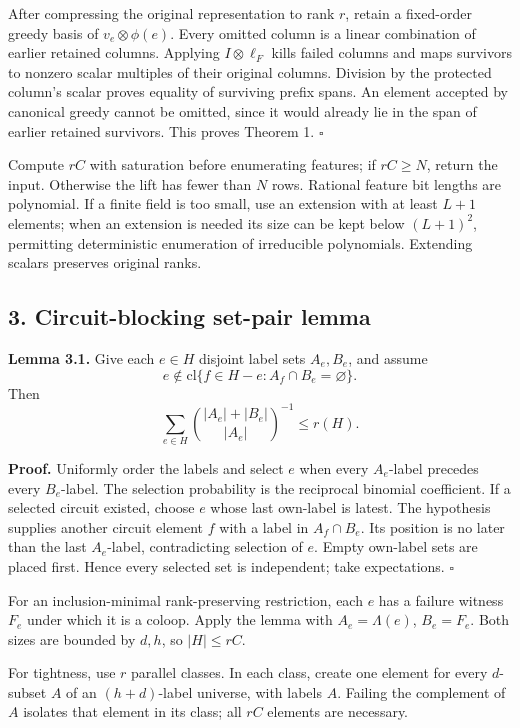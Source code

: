 After compressing the original representation to rank \(r\), retain a fixed-order greedy basis of \(v_e\otimes\phi(e)\). Every omitted column is a linear combination of earlier retained columns. Applying \(I\otimes\ell_F\) kills failed columns and maps survivors to nonzero scalar multiples of their original columns. Division by the protected column's scalar proves equality of surviving prefix spans. An element accepted by canonical greedy cannot be omitted, since it would already lie in the span of earlier retained survivors. This proves Theorem 1. \(\square\)

Compute \(rC\) with saturation before enumerating features; if \(rC\ge N\), return the input. Otherwise the lift has fewer than \(N\) rows. Rational feature bit lengths are polynomial. If a finite field is too small, use an extension with at least \(L+1\) elements; when an extension is needed its size can be kept below \((L+1)^2\), permitting deterministic enumeration of irreducible polynomials. Extending scalars preserves original ranks.

\hypertarget{af-240b5086c5-circuit-blocking-set-pair-lemma}{%
\subsection{3. Circuit-blocking set-pair lemma}\label{af-240b5086c5-circuit-blocking-set-pair-lemma}}

\textbf{Lemma 3.1.} Give each \(e\in H\) disjoint label sets \(A_e,B_e\), and assume \[
e\notin\mathrm{cl}\{f\in H-e:A_f\cap B_e=\varnothing\}.
\] Then \[
\sum_{e\in H}\binom{|A_e|+|B_e|}{|A_e|}^{-1}\le r(H).
\]

\textbf{Proof.} Uniformly order the labels and select \(e\) when every \(A_e\)-label precedes every \(B_e\)-label. The selection probability is the reciprocal binomial coefficient. If a selected circuit existed, choose \(e\) whose last own-label is latest. The hypothesis supplies another circuit element \(f\) with a label in \(A_f\cap B_e\). Its position is no later than the last \(A_e\)-label, contradicting selection of \(e\). Empty own-label sets are placed first. Hence every selected set is independent; take expectations. \(\square\)

For an inclusion-minimal rank-preserving restriction, each \(e\) has a failure witness \(F_e\) under which it is a coloop. Apply the lemma with \(A_e=\Lambda(e)\), \(B_e=F_e\). Both sizes are bounded by \(d,h\), so \(|H|\le rC\).

For tightness, use \(r\) parallel classes. In each class, create one element for every \(d\)-subset \(A\) of an \((h+d)\)-label universe, with labels \(A\). Failing the complement of \(A\) isolates that element in its class; all \(rC\) elements are necessary.

